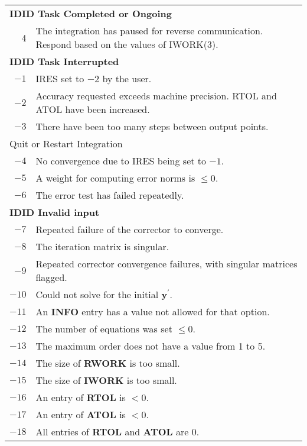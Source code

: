 \documentclass[twoside]{MATH77}
\begin{document}
\begin{tabular}{rp{2.8in}}
  \multicolumn{2}{l}{\bf IDID \hspace{.4in}  Task Completed or Ongoing}\\
  \phantom{-2}4 & The integration has paused for reverse
  communication.  Respond based on the values of IWORK(3).\\
  \multicolumn{2}{l}{\bf IDID \hspace{.4in} Task Interrupted}\label{task_int}\\
  $-1$ & IRES set to $-2$ by the user.\\
  $-2$ & Accuracy requested exceeds machine precision.  RTOL and ATOL have
  been increased.\\
  $-3$ & There have been too many steps between output points.\\
  \multicolumn{2}{l}{\hspace{.4in} Quit or Restart Integration}\\
  $-4$ & No convergence due to IRES being set to $-1$.\\
  $-5$ & A weight for computing error norms is $\leq 0$.\\
  $-6$ & The error test has failed repeatedly.\\
  \multicolumn{2}{l}{\bf IDID \hspace{.4in}  Invalid input}\\
  $-7$ & Repeated failure of the corrector to converge.\\
  $-8$ & The iteration matrix is singular.\\
  $-9$ & Repeated corrector convergence failures, with singular matrices
  flagged.\\
  $-10$ & Could not solve for the initial $\mathbf{y}^\prime$.\\
  $-11$ & An \textbf{INFO} entry has a value not allowed for that option.\\
  $-12$ & The number of equations was set $\leq 0$.\\
  $-13$ & The maximum order does not have a value from 1 to 5.\\
  $-14$ & The size of \textbf{RWORK} is too small.\\
  $-15$ & The size of \textbf{IWORK} is too small.\\ %
  $-16$ & An entry of \textbf{RTOL} is $< 0$.\\
  $-17$ & An entry of \textbf{ATOL} is $< 0$.\\
  $-18$ & All entries of \textbf{RTOL} and \textbf{ATOL} are 0.\\

\end{tabular}
\end{document}
